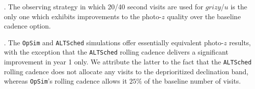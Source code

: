 \medskip {}. The observing strategy in which 20/40 second visits are used for $grizy$/$u$ is the only one which exhibits improvements to the photo-$z$ quality over the baseline cadence option.

\medskip {}. The {\tt OpSim} and {\tt ALTSched} simulations offer essentially equivalent photo-$z$ results, with the exception that the {\tt ALTSched} rolling cadence delivers a significant improvement in year 1 only. We attribute the latter to the fact that the {\tt ALTSched} rolling cadence does not allocate any visits to the deprioritized declination band, whereas {\tt OpSim}'s rolling cadence allows it $25\%$ of the baseline number of visits.

